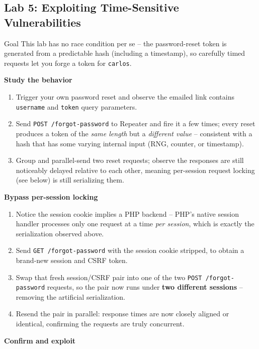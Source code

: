 \documentclass[11pt]{article}
\begin{document}
\subsection{Lab 5: Exploiting Time-Sensitive Vulnerabilities}
\begin{labbox}{Goal}
This lab has no race condition per se -- the password-reset token is generated from a predictable hash (including a timestamp), so carefully timed requests let you forge a token for \texttt{carlos}.
\end{labbox}
\textbf{Study the behavior}
\begin{enumerate}[leftmargin=1.2em]
  \item Trigger your own password reset and observe the emailed link contains \texttt{username} and \texttt{token} query parameters.
  \item Send \texttt{POST /forgot-password} to Repeater and fire it a few times; every reset produces a token of the \emph{same length} but a \emph{different value} -- consistent with a hash that has some varying internal input (RNG, counter, or timestamp).
  \item Group and parallel-send two reset requests; observe the responses are still noticeably delayed relative to each other, meaning per-session request locking (see below) is still serializing them.
\end{enumerate}
\textbf{Bypass per-session locking}
\begin{enumerate}[leftmargin=1.2em]
  \item Notice the session cookie implies a PHP backend -- PHP's native session handler processes only one request at a time \emph{per session}, which is exactly the serialization observed above.
  \item Send \texttt{GET /forgot-password} with the session cookie stripped, to obtain a brand-new session and CSRF token.
  \item Swap that fresh session/CSRF pair into one of the two \texttt{POST /forgot-password} requests, so the pair now runs under \textbf{two different sessions} -- removing the artificial serialization.
  \item Resend the pair in parallel: response times are now closely aligned or identical, confirming the requests are truly concurrent.
\end{enumerate}
\textbf{Confirm and exploit}
\end{document}
